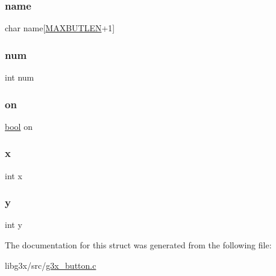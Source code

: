 \mbox{\label{struct_g3_xbut_aa998d085055b9e9634ea1781cc0163c7}} 
\subsubsection{\texorpdfstring{name}{name}}
{\footnotesize\ttfamily char name\mbox{[}\hyperlink{g3x__switch_8c_a0e40ba0c0da54aafd8c34999455ec4fa}{M\+A\+X\+B\+U\+T\+L\+EN}+1\mbox{]}}

\mbox{\label{struct_g3_xbut_a86cf672daa4e0ad11ad10efc894d19c8}} 
\subsubsection{\texorpdfstring{num}{num}}
{\footnotesize\ttfamily int num}

\mbox{\label{struct_g3_xbut_aaa928c9a62449f7946da1e32f66c70d2}} 
\subsubsection{\texorpdfstring{on}{on}}
{\footnotesize\ttfamily \hyperlink{g3x__types_8h_af6a258d8f3ee5206d682d799316314b1}{bool} on}

\mbox{\label{struct_g3_xbut_a6150e0515f7202e2fb518f7206ed97dc}} 
\subsubsection{\texorpdfstring{x}{x}}
{\footnotesize\ttfamily int x}

\mbox{\label{struct_g3_xbut_a0a2f84ed7838f07779ae24c5a9086d33}} 
\subsubsection{\texorpdfstring{y}{y}}
{\footnotesize\ttfamily int y}



The documentation for this struct was generated from the following file\+:\begin{DoxyCompactItemize}
\item 
libg3x/src/\hyperlink{g3x__button_8c}{g3x\+\_\+button.\+c}\end{DoxyCompactItemize}
